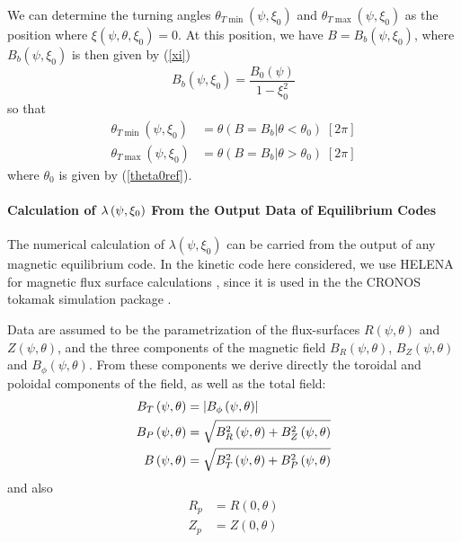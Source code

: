 
We can determine the turning angles $\theta _{T\min }\left( \psi ,\xi
_{0}\right) $ and $\theta _{T\max }\left( \psi ,\xi _{0}\right) $ as the
position where $\xi \left( \psi ,\theta ,\xi _{0}\right) =0$. At this
position, we have $B=B_{b}\left( \psi ,\xi _{0}\right) $, where $B_{b}\left(
\psi ,\xi _{0}\right) $ is then given by (\ref{xi}) 
\begin{equation}
B_{b}\left( \psi ,\xi _{0}\right) =\frac{B_{0}\left( \psi \right) }{1-\xi
_{0}^{2}}  \label{Bbounce}
\end{equation}
so that 
\begin{align}
\theta _{T\min }\left( \psi ,\xi _{0}\right) & =\theta \left( B=B_{b}\left|
\theta <\theta _{0}\right. \right) \;[2\pi ]  \label{thetamin} \\
\theta _{T\max }\left( \psi ,\xi _{0}\right) & =\theta \left( B=B_{b}\left|
\theta >\theta _{0}\right. \right) \;[2\pi ]  \label{thetamax}
\end{align}
where $\theta _{0}$ is given by (\ref{theta0ref}).

\paragraph{Calculation of $\protect\lambda\left( \protect\psi,\protect\xi%
_{0}\right) $ From the Output Data of Equilibrium Codes}

The numerical calculation of $\lambda \left( \psi ,\xi _{0}\right) $ can be
carried from the output of any magnetic equilibrium code. In the kinetic
code here considered, we use HELENA for magnetic flux surface calculations 
\cite{huy91}, since it is used in the the CRONOS tokamak simulation package 
\cite{bas03}.

Data are assumed to be the parametrization of the flux-surfaces $R\left(
\psi ,\theta \right) $ and $Z\left( \psi ,\theta \right) $, and the three
components of the magnetic field $B_{R}\left( \psi ,\theta \right) $, $%
B_{Z}\left( \psi ,\theta \right) $ and $B_{\phi }\left( \psi ,\theta \right) 
$. From these components we derive directly the toroidal and poloidal
components of the field, as well as the total field: 
\begin{align}
B_{T}\left( \psi ,\theta \right) & =\left| B_{\phi }\left( \psi ,\theta
\right) \right|  \notag \\
B_{P}\left( \psi ,\theta \right) & =\sqrt{B_{R}^{2}\left( \psi ,\theta
\right) +B_{Z}^{2}\left( \psi ,\theta \right) }  \notag \\
B\left( \psi ,\theta \right) & =\sqrt{B_{T}^{2}\left( \psi ,\theta \right)
+B_{P}^{2}\left( \psi ,\theta \right) }  \label{Btot}
\end{align}
and also 
\begin{align}
R_{p}& =R\left( 0,\theta \right) \\
Z_{p}& =Z\left( 0,\theta \right)
\end{align}


